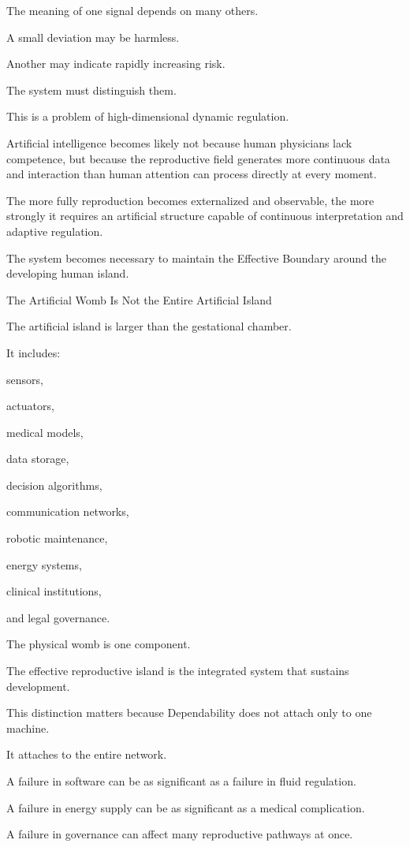 The meaning of one signal depends on many others.

A small deviation may be harmless.

Another may indicate rapidly increasing risk.

The system must distinguish them.

This is a problem of high-dimensional dynamic regulation.

Artificial intelligence becomes likely not because human physicians lack competence, but because the reproductive field generates more continuous data and interaction than human attention can process directly at every moment.

The more fully reproduction becomes externalized and observable, the more strongly it requires an artificial structure capable of continuous interpretation and adaptive regulation.

The system becomes necessary to maintain the Effective Boundary around the developing human island.

The Artificial Womb Is Not the Entire Artificial Island

The artificial island is larger than the gestational chamber.

It includes:

sensors,

actuators,

medical models,

data storage,

decision algorithms,

communication networks,

robotic maintenance,

energy systems,

clinical institutions,

and legal governance.

The physical womb is one component.

The effective reproductive island is the integrated system that sustains development.

This distinction matters because Dependability does not attach only to one machine.

It attaches to the entire network.

A failure in software can be as significant as a failure in fluid regulation.

A failure in energy supply can be as significant as a medical complication.

A failure in governance can affect many reproductive pathways at once.

